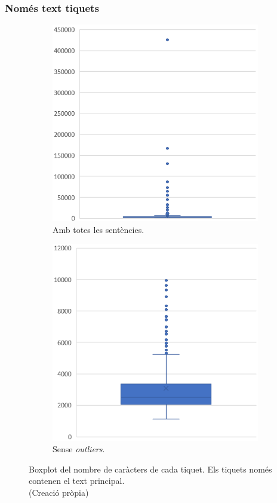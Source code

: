 \subsubsection{Només text tiquets}
\begin{figure}[H]
    \centering
    \begin{subfigure}{.5\textwidth}
      \centering
      \includegraphics[width=.7\linewidth]{boxplot_num_chars_tiquets.png}
      \caption{Amb totes les sentències.}
      \label{fig:boxplot_num_chars_tiquets}
    \end{subfigure}%
    \begin{subfigure}{.5\textwidth}
      \centering
      \includegraphics[width=.7\linewidth]{boxplot_num_chars_tiquets_outliers.png}
      \caption{Sense \textit{outliers}.}
      \label{fig:boxplot_num_chars_tiquets_outliers}
    \end{subfigure}
    \caption[Boxplot dels caràcters del text principal de cada tiquet]{Boxplot del nombre de caràcters de cada tiquet. Els tiquets només contenen el text principal. \\ (Creació pròpia)}
    \label{fig:boxplot_num_chars_tiquets_dos}
\end{figure}



